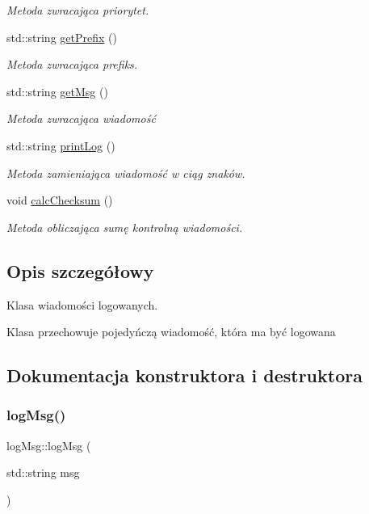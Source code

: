 \begin{DoxyCompactItemize}
\begin{DoxyCompactList}\small\item\em Metoda zwracająca priorytet. \end{DoxyCompactList}\item 
std\+::string \hyperlink{classlog_msg_af10adb316ec6ba7bd7db5b4c0c5de365}{get\+Prefix} ()
\begin{DoxyCompactList}\small\item\em Metoda zwracająca prefiks. \end{DoxyCompactList}\item 
std\+::string \hyperlink{classlog_msg_a19a5752d1cc3fc6a20d8571f4cbfc422}{get\+Msg} ()
\begin{DoxyCompactList}\small\item\em Metoda zwracająca wiadomość \end{DoxyCompactList}\item 
std\+::string \hyperlink{classlog_msg_a43ba149c673ff7b4070ec5308809ccf0}{print\+Log} ()
\begin{DoxyCompactList}\small\item\em Metoda zamieniająca wiadomość w ciąg znaków. \end{DoxyCompactList}\item 
void \hyperlink{classlog_msg_a652a3f776718a2c5800267fa898f05e6}{calc\+Checksum} ()
\begin{DoxyCompactList}\small\item\em Metoda obliczająca sumę kontrolną wiadomości. \end{DoxyCompactList}\end{DoxyCompactItemize}


\subsection{Opis szczegółowy}
Klasa wiadomości logowanych. 

Klasa przechowuje pojedyńczą wiadomość, która ma być logowana 

\subsection{Dokumentacja konstruktora i destruktora}
\mbox{\label{classlog_msg_a59a223eea638eb82439786fa0b21ae99}} 
\subsubsection{\texorpdfstring{log\+Msg()}{logMsg()}\hspace{0.1cm}{\footnotesize\ttfamily [1/2]}}
{\footnotesize\ttfamily log\+Msg\+::log\+Msg (\begin{DoxyParamCaption}\item[{std\+::string}]{msg }\end{DoxyParamCaption})}



